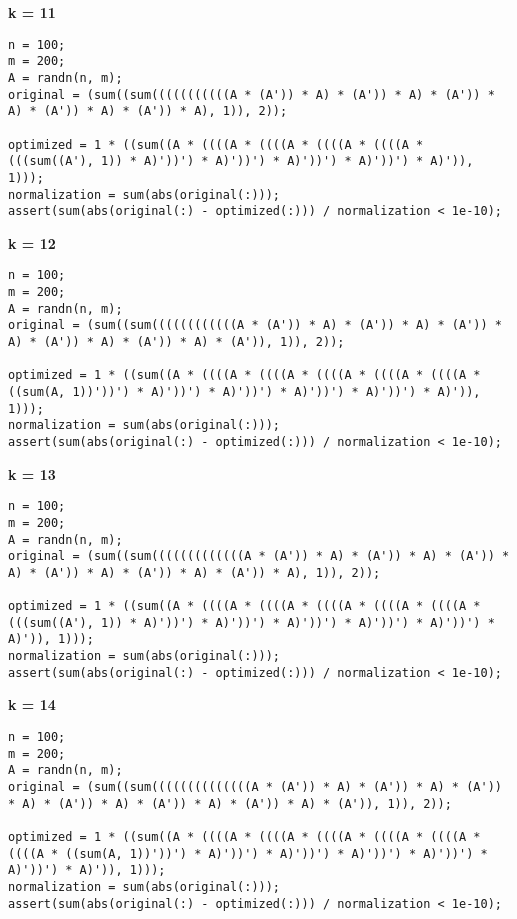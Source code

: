 {\bf k = 11}

\begin{lstlisting}
n = 100;
m = 200;
A = randn(n, m);
original = (sum((sum(((((((((((A * (A')) * A) * (A')) * A) * (A')) * A) * (A')) * A) * (A')) * A), 1)), 2));

optimized = 1 * ((sum((A * ((((A * ((((A * ((((A * ((((A * (((sum((A'), 1)) * A)'))') * A)'))') * A)'))') * A)'))') * A)')), 1)));
normalization = sum(abs(original(:)));
assert(sum(abs(original(:) - optimized(:))) / normalization < 1e-10);
\end{lstlisting}


{\bf k = 12}

\begin{lstlisting}
n = 100;
m = 200;
A = randn(n, m);
original = (sum((sum((((((((((((A * (A')) * A) * (A')) * A) * (A')) * A) * (A')) * A) * (A')) * A) * (A')), 1)), 2));

optimized = 1 * ((sum((A * ((((A * ((((A * ((((A * ((((A * ((((A * ((sum(A, 1))'))') * A)'))') * A)'))') * A)'))') * A)'))') * A)')), 1)));
normalization = sum(abs(original(:)));
assert(sum(abs(original(:) - optimized(:))) / normalization < 1e-10);
\end{lstlisting}


{\bf k = 13}

\begin{lstlisting}
n = 100;
m = 200;
A = randn(n, m);
original = (sum((sum(((((((((((((A * (A')) * A) * (A')) * A) * (A')) * A) * (A')) * A) * (A')) * A) * (A')) * A), 1)), 2));

optimized = 1 * ((sum((A * ((((A * ((((A * ((((A * ((((A * ((((A * (((sum((A'), 1)) * A)'))') * A)'))') * A)'))') * A)'))') * A)'))') * A)')), 1)));
normalization = sum(abs(original(:)));
assert(sum(abs(original(:) - optimized(:))) / normalization < 1e-10);
\end{lstlisting}


{\bf k = 14}

\begin{lstlisting}
n = 100;
m = 200;
A = randn(n, m);
original = (sum((sum((((((((((((((A * (A')) * A) * (A')) * A) * (A')) * A) * (A')) * A) * (A')) * A) * (A')) * A) * (A')), 1)), 2));

optimized = 1 * ((sum((A * ((((A * ((((A * ((((A * ((((A * ((((A * ((((A * ((sum(A, 1))'))') * A)'))') * A)'))') * A)'))') * A)'))') * A)'))') * A)')), 1)));
normalization = sum(abs(original(:)));
assert(sum(abs(original(:) - optimized(:))) / normalization < 1e-10);
\end{lstlisting}


